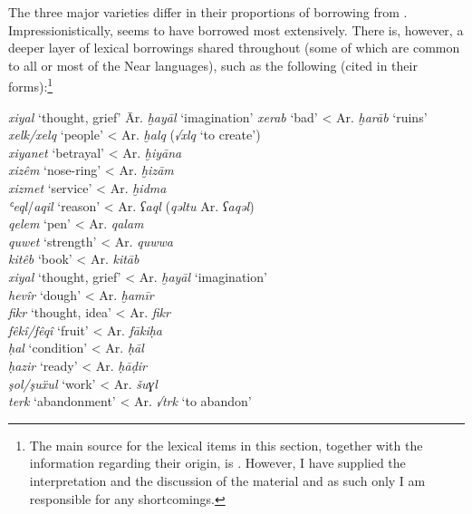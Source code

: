 \documentclass[output=paper]{langsci/langscibook}
\begin{document}
The three major varieties differ in their proportions of borrowing from . Impressionistically,   seems to have borrowed most extensively. There is, however, a deeper layer of lexical borrowings shared throughout  (some of which are common to all or most of the Near  languages), such as the following (cited in their   forms):\footnote{The main source for the lexical items in this section, together with the information regarding their  origin, is \citet{Chyet2003}. However, I have supplied the interpretation and the discussion of the material and as such only I am responsible for any shortcomings.} 

\ea
\begin{tabbing}
\textit{xiyal} ‘thought, grief’ \hspace{1em} \= Ar. \textit{ḫayāl} ‘imagination’\kill
\textit{xerab} ‘bad’     \> < Ar. \textit{ḫarāb} ‘ruins’\\
\textit{xelk/xelq} ‘people’  \> < Ar. \textit{ḫalq} (\textit{√xlq} ‘to create’)\\
\textit{xiyanet} ‘betrayal’  \> < Ar. \textit{ḫiyāna} \\
\textit{xizêm} ‘nose-ring’  \> < Ar. \textit{ḫizām}\\
\textit{xizmet} ‘service’  \> < Ar. \textit{ḫidma} \\
\textit{ʿeql}/\textit{aqil} ‘reason’  \> < Ar. \textit{ʕaql} (\textit{qəltu} Ar. \textit{ʕaqəl})\\
\textit{qelem} ‘pen’    \> < Ar. \textit{qalam}\\
\textit{quwet} ‘strength’  \> < Ar. \textit{quwwa}\\
\textit{kitêb} ‘book’    \> < Ar. \textit{kitāb}\\
\textit{xiyal} ‘thought, grief’  \> < Ar. \textit{ḫayāl} ‘imagination’\\
\textit{hevîr} ‘dough’    \> < Ar. \textit{ḫamīr} \\
\textit{fikr} ‘thought, idea’  \> < Ar. \textit{fikr}\\
\textit{fêkî/fêqî} ‘fruit’  \> < Ar. \textit{fākiḥa}\\
\textit{ḥal} ‘condition’  \> < Ar. \textit{ḥāl} \\
\textit{ḥazir} ‘ready’    \> < Ar. \textit{ḥāḍir}\\
\textit{şol/şuẍul} ‘work’  \> < Ar. \textit{šuɣl} \\
\textit{terk} ‘abandonment’  \> < Ar. \textit{√trk} ‘to abandon’
\end{tabbing}
\z
\end{document}
